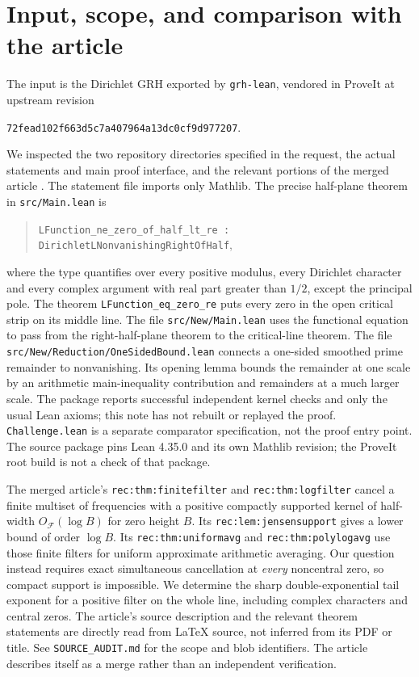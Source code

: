 \documentclass[11pt]{article}
\theoremstyle{remark}\newtheorem{remark}[theorem]{Remark}
\newcommand{\spec}{\mathcal F}
\begin{document}
\section{Input, scope, and comparison with the article}
The input is the Dirichlet GRH exported by \texttt{grh-lean}, vendored in ProveIt at upstream revision
\begin{center}\small\texttt{72fead102f663d5c7a407964a13dc0cf9d977207}.\end{center}
We inspected the two repository directories specified in the request, the actual statements and main proof interface, and the relevant portions of the merged article \cite{vendor,article}. The statement file imports only Mathlib. The precise half-plane theorem in \texttt{src/Main.lean} is
\begin{quote}\small\texttt{LFunction\_ne\_zero\_of\_half\_lt\_re : DirichletLNonvanishingRightOfHalf},\end{quote}
where the type quantifies over every positive modulus, every Dirichlet character and every complex argument with real part greater than $1/2$, except the principal pole. The theorem
\texttt{LFunction\_eq\_zero\_re} puts every zero in the open critical strip on its middle line. The file \texttt{src/New/Main.lean} uses the functional equation to pass from the right-half-plane theorem to the critical-line theorem. The file \texttt{src/New/Reduction/OneSidedBound.lean} connects a one-sided smoothed prime remainder to nonvanishing. Its opening lemma bounds the remainder at one scale by an arithmetic main-inequality contribution and remainders at a much larger scale. The package reports successful independent kernel checks and only the usual Lean axioms; this note has not rebuilt or replayed the proof. \texttt{Challenge.lean} is a separate comparator specification, not the proof entry point. The source package pins Lean 4.35.0 and its own Mathlib revision; the ProveIt root build is not a check of that package.

The merged article's \texttt{rec:thm:finitefilter} and \texttt{rec:thm:logfilter} cancel a finite multiset of frequencies with a positive compactly supported kernel of half-width $O_{\spec}(\log B)$ for zero height $B$. Its \texttt{rec:lem:jensensupport} gives a lower bound of order $\log B$. Its \texttt{rec:thm:uniformavg} and \texttt{rec:thm:polylogavg} use those finite filters for uniform approximate arithmetic averaging. Our question instead requires exact simultaneous cancellation at \emph{every} noncentral zero, so compact support is impossible. We determine the sharp double-exponential tail exponent for a positive filter on the whole line, including complex characters and central zeros. The article's source description and the relevant theorem statements are directly read from LaTeX source, not inferred from its PDF or title. See \texttt{SOURCE\_AUDIT.md} for the scope and blob identifiers. The article describes itself as a merge rather than an independent verification.
\end{document}

